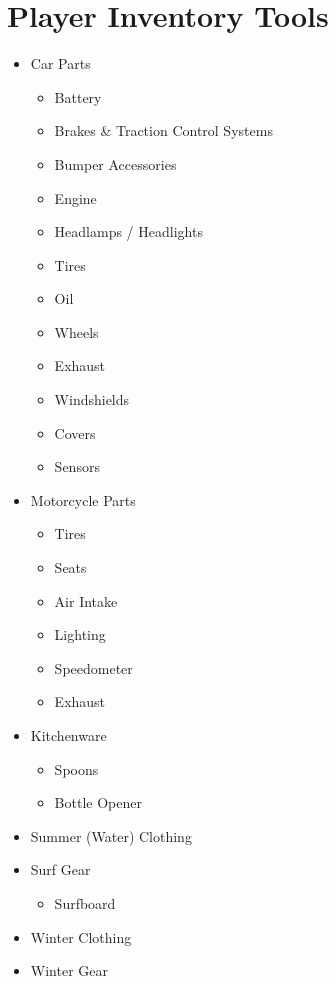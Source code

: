 \documentclass[12pt]{article}
\begin{document}
\section{Player Inventory Tools}
\begin{multicols}{2}
\begin{itemize}[noitemsep]
\item Car Parts
\begin{itemize}[noitemsep,nosep]
\item Battery
\item Brakes \& Traction Control Systems
\item Bumper Accessories
\item Engine
\item Headlamps / Headlights
\item Tires
\item Oil
\item Wheels
\item Exhaust
\item Windshields
\item Covers
\item Sensors
\end{itemize}
\item Motorcycle Parts
\begin{itemize}[noitemsep,nosep]
\item Tires
\item Seats
\item Air Intake
\item Lighting
\item Speedometer
\item Exhaust
\end{itemize}
\item Kitchenware
\begin{itemize}[noitemsep,nosep]
\item Spoons
\item Bottle Opener
\end{itemize}
\item Summer (Water) Clothing
\item Surf Gear
\begin{itemize}[noitemsep,nosep]
\item Surfboard
\end{itemize}
\item Winter Clothing
\item Winter Gear
\begin{itemize}

\end{itemize}
\end{itemize}
\end{multicols}
\end{document}
